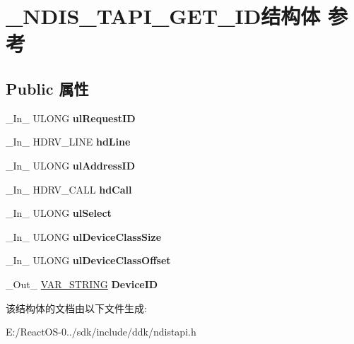 \hypertarget{struct___n_d_i_s___t_a_p_i___g_e_t___i_d}{}\section{\+\_\+\+N\+D\+I\+S\+\_\+\+T\+A\+P\+I\+\_\+\+G\+E\+T\+\_\+\+I\+D结构体 参考}
\label{struct___n_d_i_s___t_a_p_i___g_e_t___i_d}
\subsection*{Public 属性}
\begin{DoxyCompactItemize}
\item 
\mbox{\label{struct___n_d_i_s___t_a_p_i___g_e_t___i_d_a8bebeaa201b1755755102d58a874699c}} 
\+\_\+\+In\+\_\+ U\+L\+O\+NG {\bfseries ul\+Request\+ID}
\item 
\mbox{\label{struct___n_d_i_s___t_a_p_i___g_e_t___i_d_a44d21a3d04a67c60565e51fcc352ecaa}} 
\+\_\+\+In\+\_\+ H\+D\+R\+V\+\_\+\+L\+I\+NE {\bfseries hd\+Line}
\item 
\mbox{\label{struct___n_d_i_s___t_a_p_i___g_e_t___i_d_a2c50be2cefa5d97f0b84505a7e5b24e4}} 
\+\_\+\+In\+\_\+ U\+L\+O\+NG {\bfseries ul\+Address\+ID}
\item 
\mbox{\label{struct___n_d_i_s___t_a_p_i___g_e_t___i_d_ae5efcf3c94117cdb3cb624c2cc87eedf}} 
\+\_\+\+In\+\_\+ H\+D\+R\+V\+\_\+\+C\+A\+LL {\bfseries hd\+Call}
\item 
\mbox{\label{struct___n_d_i_s___t_a_p_i___g_e_t___i_d_a208f19793f6cdcb54fdf069aaa8288a2}} 
\+\_\+\+In\+\_\+ U\+L\+O\+NG {\bfseries ul\+Select}
\item 
\mbox{\label{struct___n_d_i_s___t_a_p_i___g_e_t___i_d_ae88a60d4a2ed46bd65a89784a5aa98b6}} 
\+\_\+\+In\+\_\+ U\+L\+O\+NG {\bfseries ul\+Device\+Class\+Size}
\item 
\mbox{\label{struct___n_d_i_s___t_a_p_i___g_e_t___i_d_abd16c02aaccf1bd81f8a7e7c0f44f2d3}} 
\+\_\+\+In\+\_\+ U\+L\+O\+NG {\bfseries ul\+Device\+Class\+Offset}
\item 
\mbox{\label{struct___n_d_i_s___t_a_p_i___g_e_t___i_d_a6b69998f55d9cd22696948999124c647}} 
\+\_\+\+Out\+\_\+ \hyperlink{struct___v_a_r___s_t_r_i_n_g}{V\+A\+R\+\_\+\+S\+T\+R\+I\+NG} {\bfseries Device\+ID}
\end{DoxyCompactItemize}


该结构体的文档由以下文件生成\+:\begin{DoxyCompactItemize}
\item 
E\+:/\+React\+O\+S-\/0../sdk/include/ddk/ndistapi.\+h\end{DoxyCompactItemize}
